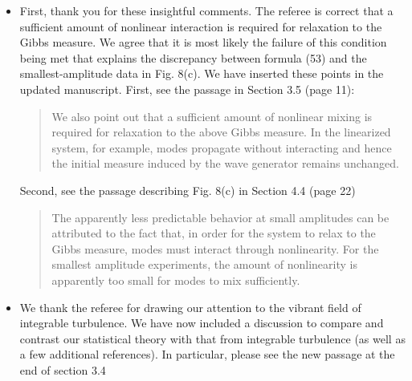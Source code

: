 \documentclass[11pt]{article}
\begin{document}
\begin{itemize}
\item First, thank you for these insightful comments. The referee is correct that a sufficient amount of nonlinear interaction is  required for relaxation to the Gibbs measure. We agree that it is most likely the failure of this condition being met that explains the discrepancy between formula (53) and the smallest-amplitude data in Fig. 8(c). We have inserted these points in the updated manuscript. First, see the passage in Section 3.5 (page 11):
\begin{quotation}
We also point out that a sufficient amount of nonlinear mixing is required for relaxation to the above Gibbs measure. In the linearized system, for example, modes propagate without interacting and hence the initial measure induced by the wave generator remains unchanged.
\end{quotation}
Second, see the passage describing Fig. 8(c) in Section 4.4 (page 22)
\begin{quotation}
The apparently less predictable behavior at small amplitudes can be attributed to the fact that, in order for the system to relax to the Gibbs measure, modes must interact through nonlinearity. For the smallest amplitude experiments, the amount of nonlinearity is apparently too small for  modes to mix sufficiently.
\end{quotation}
%
\item We thank the referee for drawing our attention to the vibrant field of integrable turbulence. We have now included a discussion to compare and contrast our statistical theory with that from integrable turbulence (as well as a few additional references). In particular, please see the new passage at the end of section 3.4
\begin{quotation}

\end{quotation}
\end{itemize}
\end{document}
